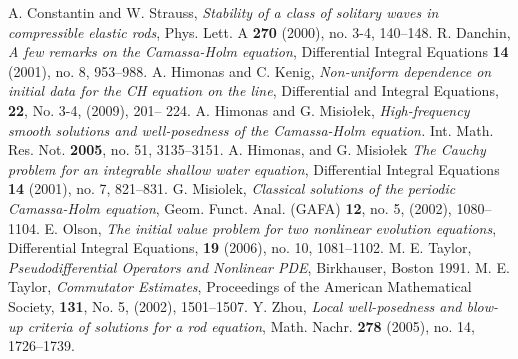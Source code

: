 \documentclass[12pt,reqno]{amsart}
\theoremstyle{plain}  %
\theoremstyle{definition}
\begin{document}
	\begin{thebibliography}{100000}
			 A. Constantin and W. Strauss, {\em Stability
				of a class of solitary waves in compressible elastic rods},
				Phys. Lett. A  {\bf 270} (2000), no. 3-4, 140--148.
				R. Danchin,  
				\textit{A few remarks on the Camassa-Holm equation}, 
				Differential Integral Equations {\bf 14} (2001),
				no. 8, 953--988.
			 A. Himonas and C. Kenig, 
				{\em Non-uniform dependence on initial data for
				the  CH equation on the line}, 
				Differential and Integral Equations,
				{\bf 22}, No. 3-4, (2009), 201-- 224.				
			 A. Himonas and G. Misio\l ek,
				{\em High-frequency smooth solutions and well-posedness of
				the Camassa-Holm equation.}
				Int. Math. Res. Not. {\bf 2005}, no. 51, 3135--3151. 
				A. Himonas,  and  G. Misio\l ek 
				\textit{The Cauchy problem for an integrable shallow water equation},
				Differential Integral Equations {\bf 14} (2001),
				no. 7, 821--831.
				G. Misiolek,
				{\em Classical solutions of the periodic Camassa-Holm equation},
				Geom. Funct. Anal. (GAFA) {\bf 12}, no. 5, (2002), 1080--1104.
			 E. Olson, {\em The initial value problem for two nonlinear
				evolution equations}, Differential Integral Equations, {\bf 19} (2006),
				no. 10, 1081--1102.  
				M. E. Taylor,
				{\em Pseudodifferential Operators and
				Nonlinear PDE}, Birkhauser, Boston 1991.
				M. E. Taylor,
				{\em Commutator Estimates}, 
				Proceedings of the American Mathematical Society,
				{\bf 131}, No. 5, (2002), 1501--1507.				
				Y. Zhou, {\em Local well-posedness and blow-up criteria of
				solutions for a rod equation}, Math. Nachr. {\bf 278} (2005),
				no. 14, 1726--1739.

		\end{thebibliography}

		
\end{document}
